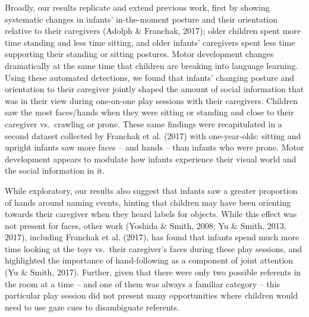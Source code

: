 \documentclass[english,man]{apa6}
\begin{document}
Broadly, our results replicate and extend previous work, first by
showing systematic changes in infants' in-the-moment posture and their
orientation relative to their caregivers (Adolph \& Franchak, 2017);
older children spent more time standing and less time sitting, and older
infants' caregivers spent less time supporting their standing or sitting
postures. Motor development changes dramatically at the same time that
children are breaking into language learning. Using these automated
detections, we found that infants' changing posture and orientation to
their caregiver jointly shaped the amount of social information that was
in their view during one-on-one play sessions with their caregivers.
Children saw the most faces/hands when they were sitting or standing and
close to their caregiver vs.~crawling or prone. These same findings were
recapitulated in a second dataset collected by Franchak et al. (2017)
with one-year-olds: sitting and upright infants saw more faces -- and
hands -- than infants who were prone. Motor development appears to
modulate how infants experience their visual world and the social
information in it.

While exploratory, our results also suggest that infants saw a greater
proportion of hands around naming events, hinting that children may have
been orienting towards their caregiver when they heard labels for
objects. While this effect was not present for faces, other work
(Yoshida \& Smith, 2008; Yu \& Smith, 2013, 2017), including Franchak et
al. (2017), has found that infants spend much more time looking at the
toys vs.~their caregiver's faces during these play sessions, and
highlighted the importance of hand-following as a component of joint
attention (Yu \& Smith, 2017). Further, given that there were only two
possible referents in the room at a time -- and one of them was always a
familiar category -- this particular play session did not present many
opportunities where children would need to use gaze cues to disambiguate
referents.
\end{document}
